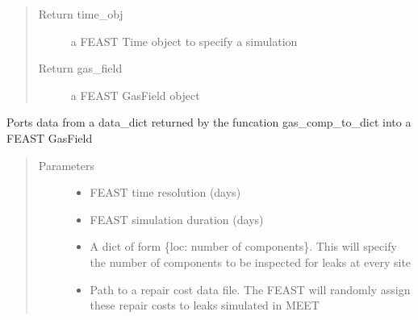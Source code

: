 \documentclass[letterpaper,10pt,english]{sphinxmanual}
\begin{document}
\begin{fulllineitems}
\begin{quote}
\begin{description}
\begin{itemize}
\end{itemize}

\item[{Return time\_obj}] \leavevmode
a FEAST Time object to specify a simulation

\item[{Return gas\_field}] \leavevmode
a FEAST GasField object

\end{description}\end{quote}

\end{fulllineitems}


\begin{fulllineitems}
\label{\detokenize{index:feast.MEET_1_importer.gc_dat_to_gas_field}}
Ports data from a data\_dict returned by the funcation gas\_comp\_to\_dict into a FEAST GasField
\begin{quote}\begin{description}
\item[{Parameters}] \leavevmode\begin{itemize}
\item {} 
 \textendash{} FEAST time resolution (days)

\item {} 
 \textendash{} FEAST simulation duration (days)

\item {} 
 \textendash{} A dict of form \{loc: number of components\}. This will specify the number of components to     be inspected for leaks at every site

\item {} 
 \textendash{} Path to a repair cost data file. The FEAST will randomly assign these repair costs to leaks     simulated in MEET


\end{itemize}
\end{description}
\end{quote}
\end{fulllineitems}
\end{document}
